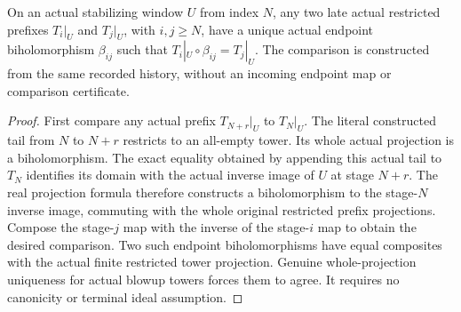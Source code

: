 \begin{theorem}
\label{hir:actual-locally-finite-history-late-prefix-comparison}
\leanok
On an actual stabilizing window $U$ from index $N$, any two late actual
restricted prefixes $T_i|_U$ and $T_j|_U$, with $i,j\ge N$, have a unique
actual endpoint biholomorphism $\beta_{ij}$ such that
$T_i|_U\circ\beta_{ij}=T_j|_U$. The comparison is constructed from the same
recorded history, without an incoming endpoint map or comparison certificate.
\end{theorem}
\begin{proof}
First compare any actual prefix $T_{N+r}|_U$ to $T_N|_U$. The literal
constructed tail from $N$ to $N+r$ restricts to an all-empty tower. Its
whole actual projection is a biholomorphism. The exact equality obtained by
appending this actual tail to $T_N$ identifies its domain with the actual
inverse image of $U$ at stage $N+r$. The real projection formula therefore
constructs a biholomorphism to the stage-$N$ inverse image, commuting with the
whole original restricted prefix projections. Compose the stage-$j$ map
with the inverse of the stage-$i$ map to obtain the desired comparison.
Two such endpoint biholomorphisms have equal composites with the actual
finite restricted tower projection. Genuine whole-projection uniqueness for
actual blowup towers forces them to agree. It requires no canonicity or
terminal ideal assumption.
\end{proof}

